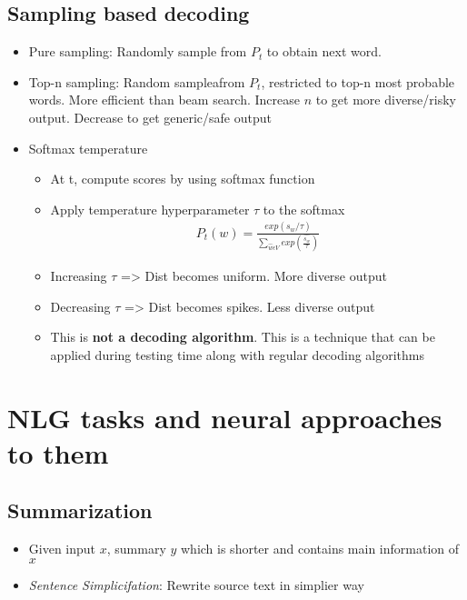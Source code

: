 \documentclass[a4paper]{article}
\begin{document}
\subsection{Sampling based decoding}
\begin{itemize}
    \item Pure sampling: Randomly sample from $P_{t}$ to obtain next word.
    \item Top-n sampling: Random sampleafrom $P_{t}$, restricted to top-n most probable words. More efficient than beam search. Increase $n$ to get more diverse/risky output. Decrease to get generic/safe output
    \item Softmax temperature
    \begin{itemize}
        \item At t, compute scores by using softmax function
        \item Apply temperature hyperparameter $\tau$ to the softmax
        \begin{equation}
        \begin{split}
            P_t(w) = \frac{exp(s_w/\tau)}{\sum_{\hat{w} \epsilon V} exp(\frac{\hat{s_w}}{\tau})}
        \end{split}
        \end{equation}
        \item Increasing $\tau$ => Dist becomes uniform. More diverse output
        \item Decreasing $\tau$ => Dist becomes spikes. Less diverse output
        \item This is \textbf{not a decoding algorithm}. This is a technique that can be applied during testing time along with regular decoding algorithms 
    \end{itemize}
\end{itemize}
\section{NLG tasks and neural approaches to them}
\subsection{Summarization}
\begin{itemize}
    \item Given input $x$, summary $y$ which is shorter and contains main information of $x$ \item \textit{Sentence Simplicifation}: Rewrite source text in simplier way
\end{itemize}
\end{document}
